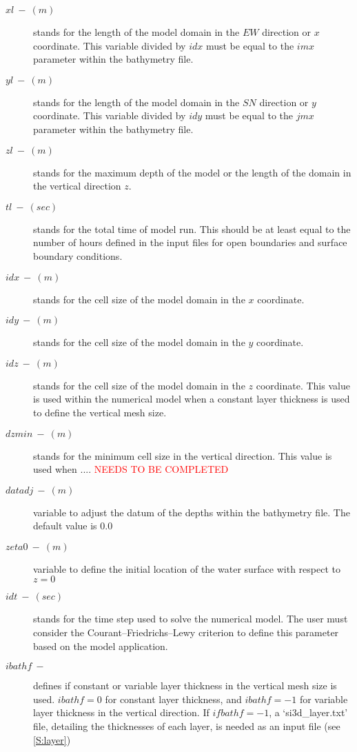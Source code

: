 \begin{description}
    \item [$xl\ -\ (m)$] stands for the length of the model domain in the $EW$ direction or $x$ coordinate. This variable divided by $idx$ must be equal to the $imx$ parameter within the bathymetry file.
    \item [$yl\ -\ (m)$] stands for the length of the model domain in the $SN$ direction or $y$ coordinate. This variable divided by $idy$ must be equal to the $jmx$ parameter within the bathymetry file.
    \item [$zl\ -\ (m)$] stands for the maximum depth of the model or the length of the domain in the vertical direction $z$.
    \item [$tl\ -\ (sec)$] stands for the total time of model run. This should be at least equal to the number of hours defined in the input files for open boundaries and surface boundary conditions.
    \item [$idx\ -\ (m)$] stands for the cell size of the model domain in the $x$ coordinate.
    \item [$idy\ -\ (m)$] stands for the cell size of the model domain in the $y$ coordinate.
    \item [$idz\ -\ (m)$] stands for the cell size of the model domain in the $z$ coordinate. This value is used within the numerical model when a constant layer thickness is used to define the vertical mesh size. 
    \item [$dzmin\ -\ (m)$] stands for the minimum cell size in the vertical direction. This value is used when .... \textcolor{red}{NEEDS TO BE COMPLETED}
    \item [$datadj\ -\ (m)$] variable to adjust the datum of the depths within the bathymetry file. The default value is $0.0$
    \item [$zeta0\ -\ (m)$] variable to define the initial location of the water surface with respect to $z = 0$
    \item [$idt\ -\ (sec)$] stands for the time step used to solve the numerical model. The user must consider the Courant–Friedrichs–Lewy criterion to define this parameter based on the model application.
    \item [$ibathf\ -$] defines if constant or variable layer thickness in the vertical mesh size is used. $ibathf = 0$ for constant layer thickness, and $ibathf = -1$ for variable layer thickness in the vertical direction. If $ifbathf = -1$, a `si3d\_layer.txt' file, detailing the thicknesses of each layer, is needed as an input file (see \ref{S:layer})
\end{description}

